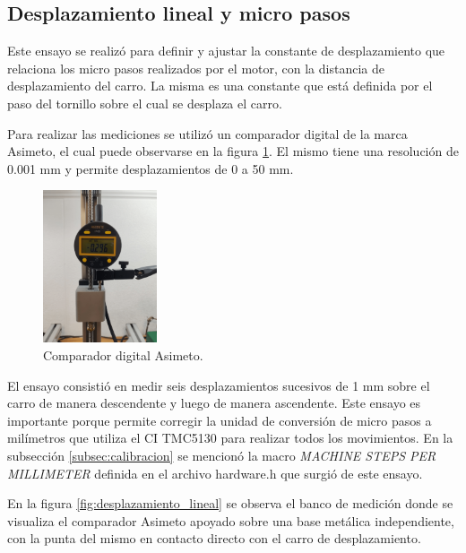 \subsection{Desplazamiento lineal y micro pasos}

Este ensayo se realizó para definir y ajustar la constante de desplazamiento que relaciona los micro pasos realizados por el motor, con la distancia de desplazamiento del carro. La misma es una constante que está definida por el paso del tornillo sobre el cual se desplaza el carro.

Para realizar las mediciones se utilizó un comparador digital de la marca Asimeto\citep{web_asimeto}, el cual puede observarse en la figura \ref{fig:micrometro}. El mismo tiene una resolución de 0.001 mm y permite desplazamientos de 0 a 50 mm.


\begin{figure}[h!]
\centering 
\includegraphics[width=0.3\textwidth]{./Figures/micrometro.png}
\caption{Comparador digital Asimeto.}
\label{fig:micrometro}
\end{figure}

El ensayo consistió en medir seis desplazamientos sucesivos de 1 mm sobre el carro de manera descendente y luego de manera ascendente. Este ensayo es importante porque permite corregir la unidad de conversión de micro pasos a milímetros que utiliza el CI TMC5130 para realizar todos los movimientos. 
En la subsección \ref{subsec:calibracion} se mencionó la macro \textit{MACHINE STEPS PER MILLIMETER} definida en el archivo hardware.h que surgió de este ensayo. 

En la figura \ref{fig:desplazamiento_lineal} se observa el banco de medición donde se visualiza el comparador Asimeto apoyado sobre una base metálica independiente, con la punta del mismo en contacto directo con el carro de desplazamiento.

